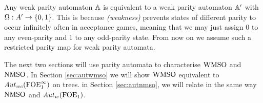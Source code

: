 \begin{remark}
Any weak parity automaton $\mathbb{A}$ is equivalent to a weak parity automaton
$\mathbb{A}'$ with $\Omega: A' \to \{0,1\}$. This is because \emph{(weakness)} prevents states of different parity to occur infinitely often in acceptance games, meaning that we may just assign $0$ to any even-parity and $1$ to any odd-parity state. From now on we assume such a restricted parity map for weak parity automata.
\end{remark}



The next two sections will use parity automata to characterise $\mathrm{WMSO}$ and $\mathrm{NMSO}$. In Section \ref{sec:autwmso} we will show $\mathrm{WMSO}$ equivalent to $\mathit{Aut}_{wc}(\mathrm{FOE}^{\infty}_1)$ on trees. in Section \ref{sec:autnmso}, we will relate in the same way $\mathrm{NMSO}$ and $\mathit{Aut}_{w}(\mathrm{FOE}_1)$.

